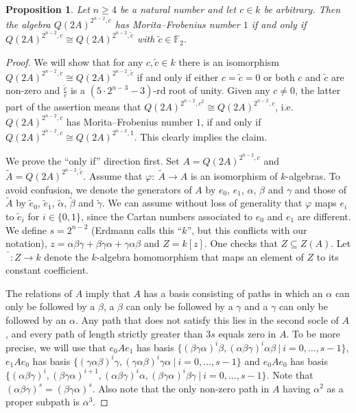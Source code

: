 \documentclass{amsart}
\theoremstyle{plain}\newtheorem{Theorem}{Theorem}[section]
\theoremstyle{plain}\newtheorem{Conjecture}[Theorem]{Conjecture}
\theoremstyle{plain}\newtheorem{Corollary}[Theorem]{Corollary}
\theoremstyle{plain}\newtheorem{Lemma}[Theorem]{Lemma}
\theoremstyle{plain}\newtheorem{Proposition}[Theorem]{Proposition}
\theoremstyle{definition}\newtheorem{Definition}[Theorem]{Definition}
\theoremstyle{definition}\newtheorem{Example}[Theorem]{Example}
\theoremstyle{definition}\newtheorem{Examples}[Theorem]{Examples}
\theoremstyle{definition}\newtheorem{Exercise}[Theorem]{Exercise}
\theoremstyle{definition}\newtheorem{Notation}[Theorem]{Notation}
\theoremstyle{definition}\newtheorem{Remark}[Theorem]{Remark}
\theoremstyle{definition}\newtheorem{Remarks}[Theorem]{Remarks}
\numberwithin{equation}{section}
\begin{document}
\begin{Proposition}\label{prop:Q2A}
  Let $n\geq 4$ be a natural number and let $c\in k$ be arbitrary. Then the algebra $Q(2A)^{2^{n-2},c}$ has Morita--Frobenius number $1$ if and only if $Q(2A)^{2^{n-2},c} \cong Q(2A)^{2^{n-2},\tilde c}$ with $\tilde c\in \mathbb F_2$.
\end{Proposition}
\begin{proof}
  We will show that for any $c,\tilde c\in k$ there is an isomorphism $Q(2A)^{2^{n-2},c} \cong Q(2A)^{2^{n-2},\tilde c}$ if and only if either $c=\tilde c=0$ or both $c$ and $\tilde c$ are non-zero and $\frac{\tilde c}{c}$ is a $(5\cdot 2^{n-3}-3)$-rd root of unity. Given any $c\neq 0$, the latter part of the assertion means that $Q(2A)^{2^{n-2},c^2} \cong Q(2A)^{2^{n-2},c}$, i.e. $Q(2A)^{2^{n-2},c}$ has Morita--Frobenius number $1$, if and only if $Q(2A)^{2^{n-2},c} \cong Q(2A)^{2^{n-2},1}$. This clearly implies the claim. 

  We prove the ``only if'' direction first. Set $A=Q(2A)^{2^{n-2},c}$ and $\tilde A=Q(2A)^{2^{n-2},\tilde c}$. Assume that $\varphi:\ \tilde A \longrightarrow A$ is an isomorphism of $k$-algebras. To avoid confusion, we denote the generators of $A$ by $e_0$, $e_1$, $\alpha$, $\beta$ and $\gamma$ and those of $\tilde A$ by $\tilde e_0$, $\tilde e_1$, $\tilde \alpha$, $\tilde \beta$ and $\tilde \gamma$. We can assume without loss of generality that $\varphi$ maps $e_i$ to $\tilde e_i$ for $i\in\{0,1\}$, since the Cartan numbers associated to $e_0$ and $e_1$ are different. 
  We define $s=2^{n-2}$ (Erdmann calls this ``$k$'', but this conflicts with our notation), $z=\alpha\beta\gamma+\beta\gamma\alpha+\gamma\alpha\beta$ and $Z=k[z]$.  One checks that $Z\subseteq Z(A)$. Let $\bar{\phantom{f}}: Z\longrightarrow k$ denote the $k$-algebra homomorphism that maps an element of $Z$ to its constant coefficient. 
  
  The relations of $A$ imply that $A$ has a basis consisting of paths in which an $\alpha$ can only be followed by a $\beta$, a $\beta$ can only be followed by a $\gamma$ and a $\gamma$ can only be followed by an $\alpha$. Any path that does not satisfy this lies in the second socle of $A$, and every path of length strictly greater than $3s$ equals zero in $A$. To be more precise, we will use that
  $e_0Ae_1$ has basis $\{ (\beta\gamma\alpha)^i \beta, (\alpha\beta\gamma)^i \alpha\beta \ | \ i=0,\ldots,s-1\}$, 
   $e_1Ae_0$ has basis $\{ (\gamma\alpha\beta)^i \gamma, (\gamma\alpha\beta)^i \gamma\alpha \ | \ i=0,\ldots,s-1\}$ and 
   $e_0Ae_0$ has basis $\{(\alpha\beta\gamma)^i, (\beta\gamma\alpha)^{i+1}, (\alpha\beta\gamma)^i\alpha, (\beta\gamma\alpha)^i\beta\gamma \ | \ i=0,\ldots,s-1\}$. Note that $(\alpha\beta\gamma)^s=(\beta\gamma\alpha)^s$. Also note that the only non-zero path in $A$ having $\alpha^2$ as a proper subpath is $\alpha^3$.


\end{proof}
\end{document}
